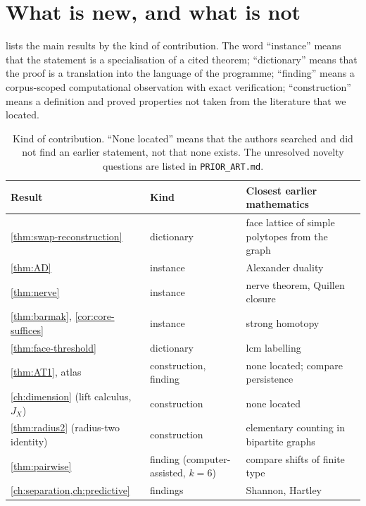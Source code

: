 \section{What is new, and what is not}\label{sec:novelty}
 lists the main results by the kind of contribution. The word ``instance'' means that the statement is a specialisation of a cited theorem; ``dictionary'' means that the proof is a translation into the language of the programme; ``finding'' means a corpus-scoped computational observation with exact verification; ``construction'' means a definition and proved properties not taken from the literature that we located.
\begin{table}[ht]\centering\footnotesize
\setlength{\tabcolsep}{4pt}
\begin{tabular}{@{}p{3.6cm}p{2.3cm}p{6.1cm}@{}}
\toprule
Result & Kind & Closest earlier mathematics\\\midrule
\cref{thm:swap-reconstruction} & dictionary & face lattice of simple polytopes from the graph \cite{BlindManiLevitska,Kalai88}\\
\cref{thm:AD} & instance & Alexander duality \cite{Hatcher}\\
\cref{thm:nerve} & instance & nerve theorem, Quillen closure \cite{Borsuk,Bjorner,Quillen}\\
\cref{thm:barmak}, \cref{cor:core-suffices} & instance & strong homotopy \cite{BarmakMinian}\\
\cref{thm:face-threshold} & dictionary & lcm labelling \cite{BayerSturmfels,MillerSturmfels}\\
\cref{thm:AT1}, atlas & construction, finding & none located; compare persistence \cite{Carlsson09}\\
\cref{ch:dimension} (lift calculus, $J_X$) & construction & none located\\
\cref{thm:radius2} (radius-two identity) & construction & elementary counting in bipartite graphs\\
\cref{thm:pairwise} & finding (computer-assisted, $k=6$) & compare shifts of finite type \cite{LindMarcus}\\
\cref{ch:separation,ch:predictive} & findings & Shannon, Hartley \cite{Shannon48,Hartley28,CoverThomas}\\
\bottomrule
\end{tabular}
\caption{Kind of contribution. ``None located'' means that the authors searched and did not find an earlier statement, not that none exists. The unresolved novelty questions are listed in \texttt{PRIOR\_ART.md}.}\label{tab:novelty}
\end{table}
